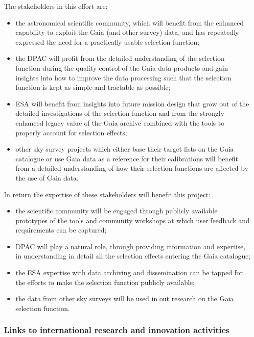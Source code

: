 The stakeholders in this effort are:
\begin{itemize}
    \item the astronomical scientific community, which will benefit from the enhanced capability to exploit the Gaia (and other survey) data, and has repeatedly expressed the need for a practically usable selection function;
    \item the DPAC will profit from the detailed understanding of the selection function during the quality control of the Gaia data products and gain insights into how to improve the data processing such that the selection function is kept as simple and tractable as possible;
    \item ESA will benefit from insights into future mission design that grow out of the detailed investigations of the selection function and from the strongly enhanced legacy value of the Gaia archive combined with the tools to properly account for selection effects;
    \item other sky survey projects which either base their target lists on the Gaia catalogue or use Gaia data as a reference for their calibrations will benefit from a detailed understanding of how their selection functions are affected by the use of Gaia data.
\end{itemize}
In return the expertise of these stakeholders will benefit this project:
\begin{itemize}
    \item the scientific community will be engaged through publicly available prototypes of the {\acro} tools and community workshops at which user feedback and requirements can be captured;
    \item DPAC will play a natural role, through providing information and expertise, in understanding in detail all the selection effects entering the Gaia catalogue;
    \item the ESA expertise with data archiving and dissemination can be tapped for the efforts to make the selection function publicly available; 
    \item the data from other sky surveys will be used in out research on the Gaia selection function.
\end{itemize}
 
\subsubsection{Links to international research and innovation activities}
\label{sec:linksinternational}

